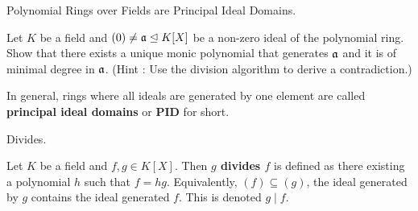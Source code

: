 \documentclass[../book.tex]{subfiles}
\begin{document}
\begin{ex} Polynomial Rings over Fields are Principal Ideal Domains. 
    
    Let $K$ be a field and $(0) \neq \mathfrak{a} \trianglelefteq K[X]$ be a non-zero ideal 
    of the polynomial ring. 
    Show that there exists a unique monic polynomial that generates $\mathfrak{a}$
    and it is of minimal degree in $\mathfrak{a}$. 
    (Hint : Use the division algorithm to derive a contradiction.)
    
    In general, rings where all ideals are generated by one element
    are called \textbf{principal ideal domains} or \textbf{PID} for short.
\end{ex}
\begin{dfn} Divides.
    
    Let $K$ be a field and $f, g \in K[X]$.
    Then \textbf{$g$ divides $f$} is defined as there existing a polynomial $h$
    such that $f = hg$. 
    Equivalently, $(f) \subseteq (g)$,
    the ideal generated by $g$ contains the ideal generated $f$.
    This is denoted $g \mid f$. 
\end{dfn}
\end{document}
